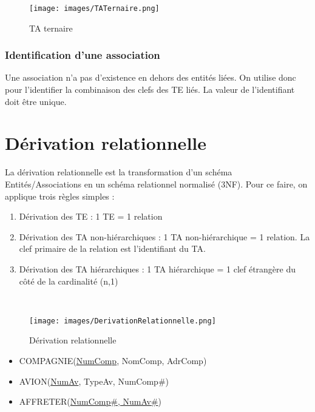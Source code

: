 \documentclass[10pt]{article}
\begin{document}
				\begin{figure}[H]
					\begin{center}
						\texttt{[image: images/TATernaire.png]}
					\end{center}
					\caption{TA ternaire}
				\end{figure}
				
			\subsubsection{Identification d'une association}
				Une association n'a pas d'existence en dehors des entités liées. On utilise donc pour l'identifier la combinaison des clefs des TE liés. La valeur de l'identifiant doit être unique.
				
		\section{Dérivation relationnelle}
			La dérivation relationnelle est la transformation d'un schéma Entités/Associations en un schéma relationnel normalisé (3NF). Pour ce faire, on applique trois règles simples :
			\begin{enumerate}
				\item Dérivation des TE : 1 TE = 1 relation
				\item Dérivation des TA non-hiérarchiques : 1 TA non-hiérarchique = 1 relation. La clef primaire de la relation est l'identifiant du TA.
				\item Dérivation des TA hiérarchiques : 1 TA hiérarchique = 1 clef étrangère du côté de la cardinalité (n,1)
			\end{enumerate}
			
			~\\
			\begin{figure}[H]
				\begin{center}
					\texttt{[image: images/DerivationRelationnelle.png]}
				\end{center}
				\caption{Dérivation relationnelle}
			\end{figure}
			
			\begin{itemize}
				\item COMPAGNIE(\underline{NumComp}, NomComp, AdrComp)
				\item AVION(\underline{NumAv}, TypeAv, NumComp\#)
				\item AFFRETER(\underline{NumComp\#, NumAv\#})
			\end{itemize}
			
\end{document}
